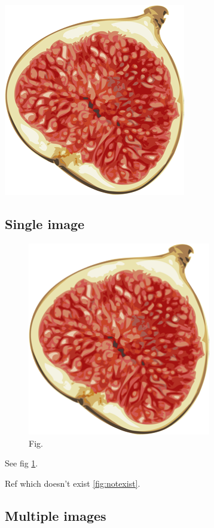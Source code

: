 \documentclass{article}
\begin{document}
  \includegraphics[]{fig.png}

  \subsection{Single image}

  \begin{figure}[h]
    \includegraphics[width=8cm]{fig.png}
    \caption{Fig.}
    \label{fig:fig}
  \end{figure}
  See fig \ref{fig:fig}.

  Ref which doesn't exist \ref{fig:notexist}.

  \subsection{Multiple images}
\end{document}
